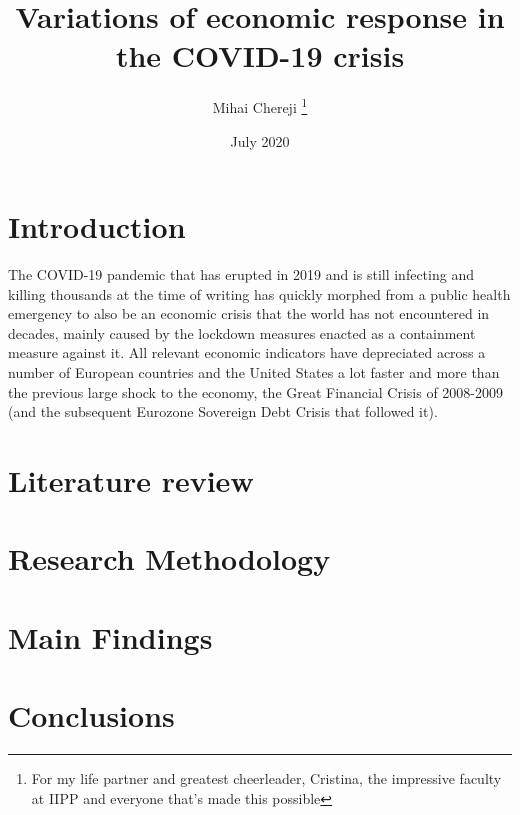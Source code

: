 \documentclass{article}
\title {Variations of economic response in the COVID-19 crisis}
\date {July 2020}
\author {Mihai Chereji
    \thanks{For my life partner and greatest cheerleader, Cristina, the impressive faculty at IIPP and everyone that's made this possible}
}
\begin{document}
\maketitle
\section{Introduction}
    The COVID-19 pandemic that has erupted in 2019 and is still infecting and killing thousands at the time of writing has quickly morphed from a public health emergency to also be an economic crisis that the world has not encountered in decades, mainly caused by the lockdown measures enacted as a containment measure against it. All relevant economic indicators  have depreciated across a number of European countries and the United States a lot faster and more than the previous large shock to the economy, the Great Financial Crisis of 2008-2009 (and the subsequent Eurozone Sovereign Debt Crisis that followed it).




\section{Literature review}
\autocite{kruppe_labour_2014} \autocite{blanchard_hysteresis_1986}
\section{Research Methodology}
\section{Main Findings}
\section{Conclusions}
\begin{figure}
\end{figure}
\printbibliography{}
\end{document}
